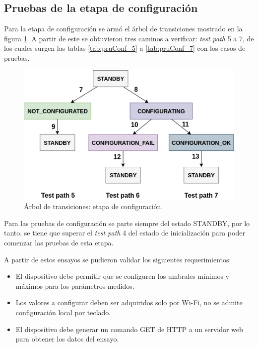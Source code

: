 \subsection{Pruebas de la etapa de configuración}

Para la etapa de configuración se armó el árbol de transiciones mostrado en la figura \ref{fig:ArTrans_2}. A partir de este se obtuvieron tres caminos a verificar: \textit{test path} 5 a 7, de los cuales surgen las tablas \ref{tab:pruConf_5} a \ref{tab:pruConf_7} con los casos de pruebas.

\begin{figure}[htpb]
	\centering
	\includegraphics[scale=1]{./Figures/ArTrans_2.png}
	\caption{Árbol de transiciones: etapa de configuración.}
	\label{fig:ArTrans_2}
\end{figure}

Para las pruebas de configuración se parte siempre del estado STANDBY, por lo tanto, se tiene que superar el \textit{test path} 4 del estado de inicialización para poder comenzar las pruebas de esta etapa.

\pagebreak

A partir de estos ensayos se pudieron validar los siguientes requerimientos: 
\begin{itemize}
	\item El dispositivo debe permitir que se configuren los umbrales mínimos y máximos para los parámetros medidos. 
	\item Los valores a configurar deben ser adquiridos solo por Wi-Fi, no se admite configuración local por teclado.
	\item El dispositivo debe generar un comando GET de HTTP a un servidor web para obtener los datos del ensayo.
\end{itemize}

